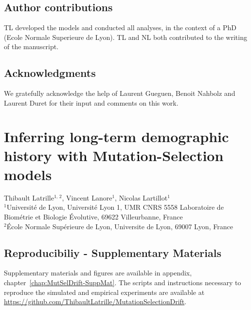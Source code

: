 \documentclass[a4paper,oneside,nobind]{thesis}
\begin{document}
{\hypersetup{linkcolor=GREYDARK}\minitoc}


\section{Author contributions}
TL developed the models and conducted all analyses, in the context of a PhD (Ecole Normale Superieure de Lyon).
TL and NL both contributed to the writing of the manuscript.

\section{Acknowledgments}
We gratefully acknowledge the help of Laurent Gueguen, Benoit Nahbolz and Laurent Duret for their input and comments on this work.

\thispagestyle{empty}
\chapter[Inferring long-term population size] {Inferring long-term demographic history with Mutation-Selection models}
\label{chap:MutSelDrift}

\begin{center}
	\Large Thibault Latrille$^{\text{1, 2}}$, Vincent Lanore$^{\text{1}}$, Nicolas Lartillot$^{\text{1}}$\\
	\vspace{0.5cm}
	\normalsize
	$^{\text{1}}$Université de Lyon, Université Lyon 1, UMR CNRS 5558 Laboratoire de Biométrie et Biologie Évolutive, 69622 Villeurbanne, France\\
	$^{\text{2}}$École Normale Supérieure de Lyon, Universite de Lyon, 69007 Lyon, France\\
\end{center}

{\hypersetup{linkcolor=GREYDARK}\minitoc}



\section{Reproducibiliy - Supplementary Materials}
Supplementary materials and figures are available in appendix, chapter~\ref{chap:MutSelDrift-SuppMat}.
The scripts and instructions necessary to reproduce the simulated and empirical experiments are available at \url{https://github.com/ThibaultLatrille/MutationSelectionDrift}.
\end{document}

